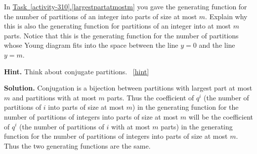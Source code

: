 \documentclass{book}
\begin{document}
\setcounter{project}{318}
\addtocounter{project}{-1}
\begin{activity}[]\label{atmostmparts}
\hypertarget{p-1590}{}%
In \hyperref[largestpartatmostm]{Task~\ref{activity-310}.\ref{largestpartatmostm}} you gave the generating function for the number of partitions of an integer into parts of size at most \(m\). Explain why this is also the generating function for partitions of an integer into at most \(m\) parts. Notice that this is the generating function for the number of partitions whose Young diagram fits into the space between the line \(y=0\) and the line \(y=m\).%
\par\smallskip%
\noindent\textbf{Hint.}\hypertarget{hint-207}{}\quad%
\hypertarget{p-1591}{}%
Think about conjugate partitions.%
~\hfill{\tiny\hyperlink{a-318}{[hint]}\hypertarget{q-318}{}}\par\smallskip%
\noindent\textbf{Solution.}\hypertarget{solution-212}{}\quad%
\hypertarget{p-1592}{}%
Conjugation is a bijection between partitions with largest part at most \(m\) and partitions with at most \(m\) parts. Thus the coefficient of \(q^i\) (the number of partitions of \(i\) into parts of size at most \(m\)) in the generating function for the number of partitions of integers into parts of size at most \(m\) will be the coefficient of \(q^i\) (the number of partitions of \(i\) with at most \(m\) parts) in the generating function for the number of partitions of integers into parts of size at most \(m\). Thus the two generating functions are the same.%
\end{activity}

\clearpage
\end{document}
